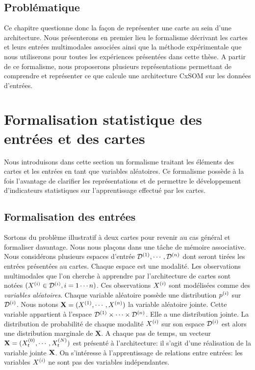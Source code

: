 \subsection{Problématique}

Ce chapitre questionne donc la façon de représenter une carte au sein d'une architecture. Nous présenterons en premier lieu le formalisme décrivant les cartes et leurs entrées multimodales associées ainsi que la méthode expérimentale que nous utiliserons pour toutes les expériences présentées dans cette thèse. A partir de ce formalisme, nous proposerons plusieurs représentations permettant de comprendre et représenter ce que calcule une architecture CxSOM sur les données d'entrées.

\section{Formalisation statistique des entrées et des cartes}

Nous introduisons dans cette section un formalisme traitant les éléments des cartes et les entrées en tant que variables aléatoires. 
Ce formalisme possède à la fois l'avantage de clarifier les représentations et de permettre le développement d'indicateurs statistiques sur l'apprentissage effectué par les cartes.

\subsection{Formalisation des entrées}
Sortons du problème illustratif à deux cartes pour revenir au cas général et formaliser davantage.
Nous nous plaçons dans une tâche de mémoire associative. 
Nous considérons plusieurs espaces d'entrée $\mathcal{D}^{({1})},\cdots,\mathcal{D}^{({n})}$ dont seront tirées les entrées présentées au cartes. Chaque espace est une modalité.
Les observations multimodales que l'on cherche à apprendre par l'architecture de cartes sont notées $(X^{({i})} \in \mathcal{D}^{({i})}, i = 1 \cdots n)$. Ces observations $X^{({i})}$ sont modélisées comme des \emph{variables aléatoires}. Chaque variable aléatoire possède une distribution $p^{({i})}$ sur $\mathcal{D}^{({i})}$.
Nous notons $\mathbf{X} = (X^{({1})}, \cdots, X^{({n})})$ la variable aléatoire jointe. Cette variable appartient à l'espace $\mathcal{D}^{({1})} \times \cdots \times \mathcal{D}^{({n})}$. Elle a une distribution jointe. La distribution de probabilité de chaque modalité $X^{({i})}$ sur son espace $\mathcal{D}^{({i})}$ est alors une distribution marginale de $\mathbf{X}$.
A chaque pas de temps, un vecteur $\mathbf{X} = (X^{({0})}_t, \cdots , X^{({N})}_t)$ est présenté à l'architecture: il s'agit d'une réalisation de la variable jointe $\mathbf{X}$. On s'intéresse à l'apprentissage de relations entre entrées: les variables $X^{({i})}$ ne sont pas des variables indépendantes.


